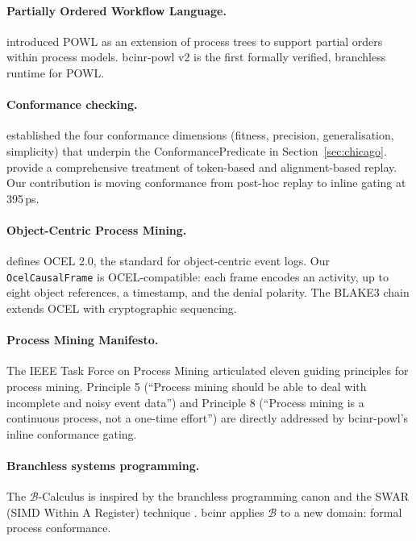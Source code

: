 \documentclass[12pt,a4paper]{article}
\theoremstyle{definition}
\theoremstyle{remark}
\begin{document}
\paragraph{Partially Ordered Workflow Language.}
\citet{kourani2023powl} introduced POWL as an extension of process trees
\citep{leemans2013inductive} to support partial orders within process models.
bcinr-powl v2 is the first formally verified, branchless runtime for POWL.

\paragraph{Conformance checking.}
\citet{rozinat2008conformance} established the four conformance dimensions
(fitness, precision, generalisation, simplicity) that underpin the
ConformancePredicate in Section~\ref{sec:chicago}.
\citet{carmona2018conformance} provide a comprehensive treatment of
token-based and alignment-based replay.
Our contribution is moving conformance from post-hoc replay to inline gating
at 395\,ps.

\paragraph{Object-Centric Process Mining.}
\citet{ocel2023} defines OCEL 2.0, the standard for object-centric event logs.
Our \texttt{OcelCausalFrame} is OCEL-compatible: each frame encodes an activity,
up to eight object references, a timestamp, and the denial polarity.
The BLAKE3 chain extends OCEL with cryptographic sequencing.

\paragraph{Process Mining Manifesto.}
The IEEE Task Force on Process Mining \citep{pmmanifesto2012} articulated
eleven guiding principles for process mining.
Principle 5 (``Process mining should be able to deal with incomplete and
noisy event data'') and Principle 8 (``Process mining is a continuous process,
not a one-time effort'') are directly addressed by bcinr-powl's inline
conformance gating.

\paragraph{Branchless systems programming.}
The $\mathcal{B}$-Calculus is inspired by the branchless programming canon
\citep{warren2013hacker} and the SWAR (SIMD Within A Register) technique
\citep{mycroft1999simd}.
bcinr applies $\mathcal{B}$ to a new domain: formal process conformance.
\end{document}
